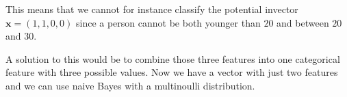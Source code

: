\documentclass{article}
\begin{document}
This means that we cannot for instance classify the potential invector
$\mathbf{x} = (1, 1, 0, 0)$ since a person cannot be both younger than $20$ and
between $20$ and $30$.

A solution to this would be to combine those three features into one
categorical feature with three possible values. Now we have a vector with just
two features and we can use naive Bayes with a multinoulli distribution.

\setcounter{section}{2}
\setcounter{subsection}{0}
\subsection{}

\subsection{}
\end{document}
